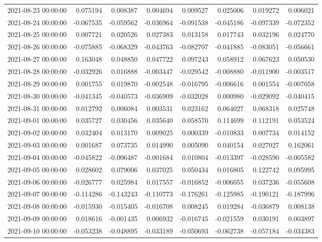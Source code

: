\begin{tabular}{lrrrrrrr}
2021-08-23 00:00:00 & 0.075194 & 0.008387 & 0.004694 & 0.009527 & 0.025006 & 0.019272 & 0.006021 \\
2021-08-24 00:00:00 & -0.067535 & -0.059562 & -0.036964 & -0.091538 & -0.045186 & -0.097339 & -0.072352 \\
2021-08-25 00:00:00 & 0.007721 & 0.020526 & 0.027383 & 0.013158 & 0.017743 & 0.032196 & 0.024770 \\
2021-08-26 00:00:00 & -0.075885 & -0.068329 & -0.043763 & -0.082707 & -0.041885 & -0.083051 & -0.056661 \\
2021-08-27 00:00:00 & 0.163048 & 0.048850 & 0.047722 & 0.097243 & 0.058912 & 0.067623 & 0.050530 \\
2021-08-28 00:00:00 & -0.032926 & 0.016888 & -0.003447 & -0.029542 & -0.008880 & -0.011900 & -0.003517 \\
2021-08-29 00:00:00 & 0.001755 & 0.019870 & -0.002548 & -0.016795 & -0.006616 & 0.001554 & -0.007058 \\
2021-08-30 00:00:00 & -0.041345 & -0.040573 & -0.036909 & -0.032028 & 0.000980 & -0.029092 & -0.040415 \\
2021-08-31 00:00:00 & 0.012792 & 0.006084 & 0.003531 & 0.023162 & 0.064027 & 0.068318 & 0.025748 \\
2021-09-01 00:00:00 & 0.035727 & 0.030456 & 0.035640 & 0.058570 & 0.114699 & 0.112191 & 0.053524 \\
2021-09-02 00:00:00 & 0.032404 & 0.013170 & 0.009025 & 0.000339 & -0.010833 & 0.007734 & 0.014152 \\
2021-09-03 00:00:00 & 0.001687 & 0.073735 & 0.014990 & 0.005090 & 0.040154 & 0.027027 & 0.162061 \\
2021-09-04 00:00:00 & -0.045822 & -0.006487 & -0.001684 & 0.010804 & -0.013397 & -0.028590 & -0.005582 \\
2021-09-05 00:00:00 & 0.028602 & 0.079006 & 0.037025 & 0.050434 & 0.016805 & 0.122742 & 0.095995 \\
2021-09-06 00:00:00 & -0.026777 & 0.025984 & 0.017557 & -0.016852 & -0.006055 & 0.037236 & -0.055608 \\
2021-09-07 00:00:00 & -0.114286 & -0.143243 & -0.110773 & -0.176261 & -0.125985 & -0.190121 & -0.187996 \\
2021-09-08 00:00:00 & -0.015930 & -0.015405 & -0.016708 & 0.008245 & 0.019284 & -0.036879 & 0.008138 \\
2021-09-09 00:00:00 & 0.018616 & -0.001435 & 0.006932 & -0.016745 & -0.021559 & 0.030191 & 0.003897 \\
2021-09-10 00:00:00 & -0.053238 & -0.048895 & -0.033189 & -0.050693 & -0.062738 & -0.057184 & -0.034383 \\

\end{tabular}

